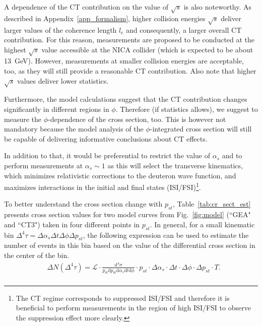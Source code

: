 
A dependence of the CT contribution on the value of $\sqrt{s}$ is also noteworthy. As described in Appendix~\ref{app_formalism}, higher collision energies $\sqrt{s}$ deliver larger values of the coherence length $l_{\textrm{c}}$ and consequently, a larger overall CT contribution. For this reason, measurements are proposed to be conducted at the highest $\sqrt{s}$ value accessible at the NICA collider (which is expected to be about 13~GeV). However, measurements at smaller collision energies are acceptable, too, as they will still provide a reasonable CT contribution. Also note that higher $\sqrt{s}$ values deliver lower statistics.


Furthermore, the model calculations suggest that the CT contribution changes significantly in different regions in $\phi$. Therefore (if statistics allows), we suggest to measure the $\phi$-dependence of the cross section, too. This is however not mandatory because the model analysis of the $\phi$-integrated cross section will still be capable of delivering informative conclusions about CT effects.

In addition to that, it would be preferential to restrict the value of $\alpha_{s}$ and to perform measurements at $\alpha_{s}\sim 1$ as this will select the transverse kinematics, which minimizes relativistic corrections to the deuteron wave function, and maximizes interactions in the initial and final states (ISI/FSI)\footnote[2]{The CT regime corresponds to suppressed ISI/FSI and therefore it is beneficial to perform measurements in the region of high ISI/FSI to observe the suppression effect more clearly.}.


To better understand the cross section change with $p_{st}$, Table~\ref{tab:cr_sect_est} presents cross section values for two model curves from Fig.~\ref{fig:model} (``GEA" and ``CT3") taken in four different points in $p_{st}$. In general, for a small kinematic bin $\Delta^{4}\tau = \Delta\alpha_{s} \Delta t \Delta \phi \Delta p_{st}$, the following expression can be used to estimate the number of events in this bin based on the value of the differential cross section in the center of the bin. \vspace{-0.3em}
\begin{equation}
\begin{aligned}
&\Delta N (\Delta^{4}\tau ) = \mathcal{L} \cdot \frac{\textrm{d}^{4}\sigma}{p_{\textrm{st}}\textrm{d}p_{\textrm{st}}\textrm{d}\alpha_{s}\textrm{d}t \textrm{d}\phi } \cdot p_{st} \cdot \Delta \alpha_{s} \cdot \Delta t \cdot \Delta \phi \cdot \Delta p_{st} \cdot T.\\[-8pt]
\end{aligned}\label{eq:n_events}
\end{equation}


